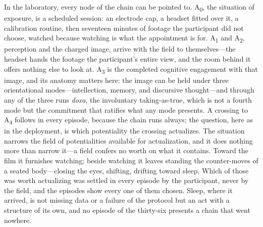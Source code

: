 In the laboratory, every node of the chain can be pointed to. A\textsubscript{0}, the situation
of exposure, is a scheduled session: an electrode cap, a headset fitted over it, a calibration
routine, then seventeen minutes of footage the participant did not choose, watched because
watching is what the appointment is for. A\textsubscript{1} and A\textsubscript{2}, perception
and the charged image, arrive with the field to themselves---the headset hands the footage the
participant's entire view, and the room behind it offers nothing else to look at.
A\textsubscript{3} is the completed cognitive engagement with that image, and its anatomy
matters here: the image can be held under three orientational modes---intellection, memory, and
discursive thought---and through any of the three runs \textit{doxa}, the involuntary
taking-as-true, which is not a fourth mode but the commitment that ratifies what any mode
presents. A crossing to A\textsubscript{4} follows in
every episode, because the chain runs always; the question, here as in the deployment, is which
potentiality the crossing actualizes. The situation narrows the field of potentialities
available for actualization, and it does nothing more than narrow it---a field confers no worth
on what it contains. Toward the film it furnishes watching; beside watching it leaves standing
the counter-moves of a seated body---closing the eyes, shifting, drifting toward sleep. Which
of those was worth actualizing was settled in every episode by the participant, never by the
field, and the episodes show every one of them chosen. Sleep, where it arrived, is not missing
data or a failure of the protocol but an act with a structure of its own, and no episode of the
thirty-six presents a chain that went nowhere.

